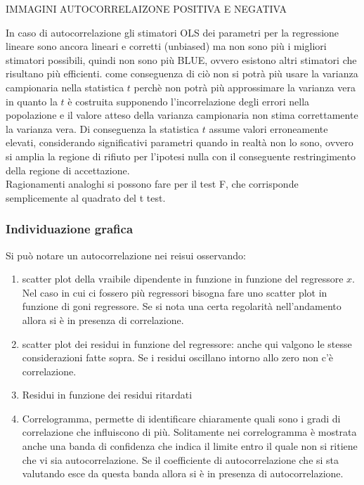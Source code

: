 \documentclass[]{article}
\begin{document}
IMMAGINI AUTOCORRELAIZONE POSITIVA E NEGATIVA

In caso di autocorrelazione gli stimatori OLS  dei parametri per la regressione lineare sono ancora lineari e corretti (unbiased) ma non sono più i migliori stimatori possibili, quindi non sono più BLUE, ovvero esistono altri stimatori che risultano più efficienti. come conseguenza di ciò non si potrà più usare la varianza campionaria nella statistica $t$ perchè non potrà più approssimare la varianza vera in quanto la $t$ è costruita supponendo l'incorrelazione degli errori nella popolazione e il valore atteso della varianza campionaria non stima correttamente la varianza vera. Di conseguenza la statistica $t$ assume valori erroneamente elevati, considerando significativi parametri quando in realtà non lo sono, ovvero si amplia la regione di rifiuto per l'ipotesi nulla con il conseguente restringimento della regione di accettazione. \\
Ragionamenti analoghi si possono fare per il test F, che corrisponde semplicemente al quadrato del t test.

\subsubsection{Individuazione grafica}
Si può notare un autocorrelazione nei reisui osservando:
\begin{enumerate}
	\item scatter plot della vraibile dipendente in funzione in funzione del regressore $x$. Nel caso in cui ci fossero più regressori bisogna fare uno scatter plot in funzione di goni regressore. Se si nota una certa regolarità nell'andamento allora si è in presenza di correlazione.
	\item scatter plot dei residui in funzione del regressore: anche qui valgono le stesse considerazioni fatte sopra. Se i residui oscillano intorno allo zero non c'è correlazione.
	\item Residui in funzione dei residui ritardati
	\item Correlogramma, permette di identificare chiaramente quali sono i gradi di correlazione che influiscono di più. Solitamente nei correlogramma è mostrata anche una banda di confidenza che indica il limite entro il quale non si ritiene che vi sia autocorrelazione. Se il coefficiente di autocorrelazione che si sta valutando esce da questa banda allora si è in presenza di autocorrelazione.
\end{enumerate}
\end{document}
